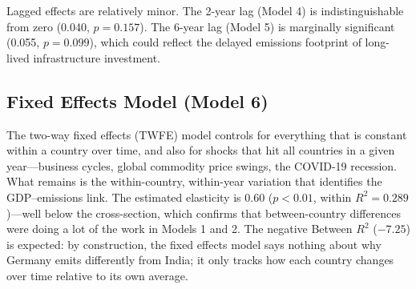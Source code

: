 \documentclass[12pt, a4paper]{article}
\begin{document}
Lagged effects are relatively minor. The 2-year lag (Model 4) is indistinguishable from zero (0.040, $p = 0.157$). The 6-year lag (Model 5) is marginally significant (0.055, $p = 0.099$), which could reflect the delayed emissions footprint of long-lived infrastructure investment.

\subsection{Fixed Effects Model (Model 6)}

The two-way fixed effects (TWFE) model controls for everything that is constant within a country over time, and also for shocks that hit all countries in a given year---business cycles, global commodity price swings, the COVID-19 recession. What remains is the within-country, within-year variation that identifies the GDP--emissions link. The estimated elasticity is 0.60 ($p < 0.01$, within $R^2 = 0.289$)---well below the cross-section, which confirms that between-country differences were doing a lot of the work in Models 1 and 2. The negative Between $R^2$ ($-7.25$) is expected: by construction, the fixed effects model says nothing about why Germany emits differently from India; it only tracks how each country changes over time relative to its own average.
\end{document}
